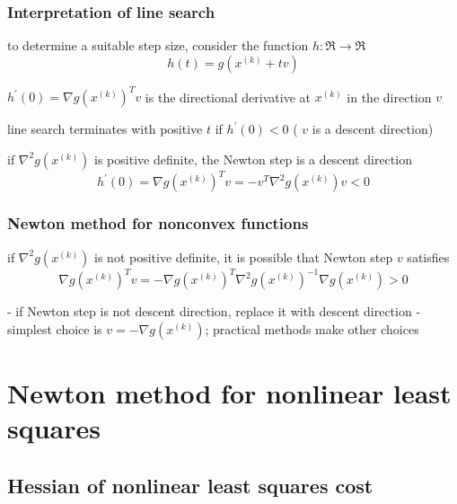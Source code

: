 \subsubsection{Interpretation of line search} 

to determine a suitable step size, consider the function $ h: \mathfrak{R} \rightarrow \mathfrak{R} $
\begin{equation}
h(t)=g\left(x^{(k)}+t v\right)
\end{equation}


$ h^{\prime}(0)=\nabla g\left(x^{(k)}\right)^{T} v $ is the directional derivative at $ x^{(k)} $ in the direction $ v $

line search terminates with positive $ t $ if $ h^{\prime}(0)<0 $ ( $ v $ is a descent direction)

if $ \nabla^{2} g\left(x^{(k)}\right) $ is positive definite, the Newton step is a descent direction
\begin{equation}
h^{\prime}(0)=\nabla g\left(x^{(k)}\right)^{T} v=-v^{T} \nabla^{2} g\left(x^{(k)}\right) v<0
\end{equation}

\subsubsection{Newton method for nonconvex functions}

if $ \nabla^{2} g\left(x^{(k)}\right) $ is not positive definite, it is possible that Newton step $ v $ satisfies
\begin{equation}
\nabla g\left(x^{(k)}\right)^{T} v=-\nabla g\left(x^{(k)}\right)^{T} \nabla^{2} g\left(x^{(k)}\right)^{-1} \nabla g\left(x^{(k)}\right)>0
\end{equation}


- if Newton step is not descent direction, replace it with descent direction
- simplest choice is $ v=-\nabla g\left(x^{(k)}\right) $; practical methods make other choices

\section{Newton method for nonlinear least squares}

\subsection{Hessian of nonlinear least squares cost}

